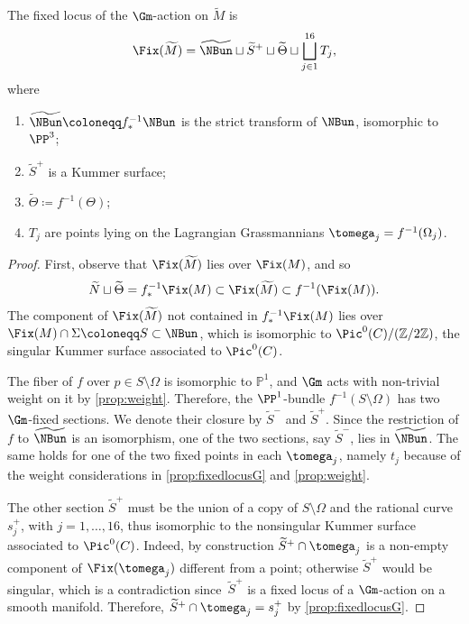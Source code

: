 \begin{prop} \label{prop:fixedlocusMtilde}
The fixed locus of the $\Gm$\nobreakdash-action on $\widetilde{M}$ is
\[
\Fix(\widetilde{M})= \widetilde{\NBun} \sqcup \widetilde{S}^+ \sqcup \widetilde{\Theta} \sqcup \bigsqcup^{16}_{j \in 1} T_j,
\]
where
\begin{enumerate}
\item $\widetilde{\NBun} \coloneqq f^{-1}_*\NBun$ is the strict transform of $\NBun$, isomorphic to $\PP^3$;
\item $\widetilde{S}^+$ is a Kummer surface;
\item $\widetilde{\Theta} \coloneqq f^{-1}(\Theta)$;
\item $T_j$ are points lying on the Lagrangian Grassmannians $\tomega_j = f^{-1}(\Omega_j)$.
\end{enumerate}
\end{prop}
\begin{proof}
First, observe that $\Fix(\widetilde{M})$ lies over $\Fix(M)$, and so
\[
\widetilde{N} \sqcup \widetilde{\Theta} = f^{-1}_*\Fix(M) \subset \Fix(\widetilde{M}) \subset f^{-1} (\Fix(M)).
\]
The component of $\Fix(\widetilde{M})$ not contained in $f^{-1}_*\Fix(M)$ lies over $\Fix(M) \cap \Sigma \coloneqq S \subset \NBun$, which is isomorphic to $\Pic^0(C)/(\mathbb{Z}/2\mathbb{Z})$, \ie the singular Kummer surface associated to $\Pic^0(C)$.

The fiber of $f$ over $p \in S \setminus \Omega$ is isomorphic to $\mathbb{P}^1$, and $\Gm$ acts with non-trivial weight on it by \cref{prop:weight}. Therefore, the $\PP^1$-bundle $f^{-1}(S \setminus \Omega)$ has two $\Gm$\nobreakdash-fixed sections. We denote their closure by $\widetilde{S}^{-}$ and $\widetilde{S}^{+}$. Since the restriction of $f$ to $\widetilde{\NBun}$ is an isomorphism, one of the two sections, say $\widetilde{S}^{-}$, lies in $\widetilde{\NBun}$. The same holds for one of the two fixed points in each $\tomega_j$, namely $t_j$ because of the weight considerations in \cref{prop:fixedlocusG} and \cref{prop:weight}.

The other section $\widetilde{S}^{+}$ must be the union of a copy of $S \setminus \Omega$ and the rational curve~$s^{+}_j$, with $j=1, \ldots, 16$, thus isomorphic to the nonsingular Kummer surface associated to $\Pic^0(C)$. Indeed, by construction $\widetilde{S}^{+} \cap \tomega_j$ is a non-empty component of $\Fix(\tomega_j)$ different from a point; otherwise $\widetilde{S}^{+}$ would be singular, which is a contradiction since~$\widetilde{S}^{+}$ is a fixed locus of a $\Gm$\nobreakdash-action on a smooth manifold. Therefore, $\widetilde{S}^{+} \cap \tomega_j = s^{+}_j$ by \cref{prop:fixedlocusG}.
\end{proof}

